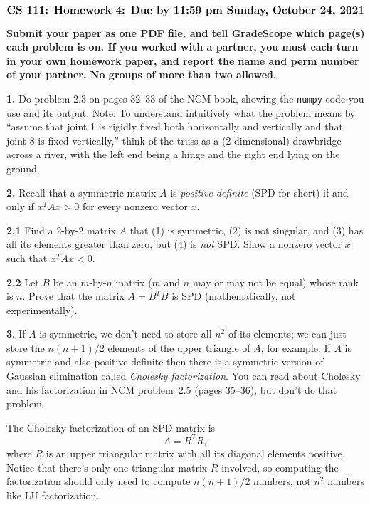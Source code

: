 \documentclass[11pt]{article}
\begin{document}
$$\mbox{\Large \bf CS 111: Homework 4: Due by 11:59 pm Sunday, October 24, 2021}$$
\par\smallskip\noindent
{\bf Submit your paper as one PDF file,
and tell GradeScope which page(s) each problem is on.
If you worked with a partner, you must each turn in your own 
homework paper, and report the name and perm number of your partner.
No groups of more than two allowed.
}

\par\bigskip
{\bf 1.}
Do problem 2.3 on pages 32--33 of the NCM book, 
showing the {\tt numpy} code you use and its output. 
Note: To understand intuitively what the problem means by 
``assume that joint 1 is rigidly fixed both horizontally and vertically 
and that joint 8 is fixed vertically,'' 
think of the truss as a (2-dimensional) drawbridge across a river, 
with the left end being a hinge and the right end lying on the ground.


\par\bigskip
{\bf 2.} Recall that a symmetric matrix $A$ is {\em positive definite}
(SPD for short) if and only if $x^TAx>0$ for every nonzero vector $x$.

\par\medskip
{\bf 2.1} Find a 2-by-2 matrix $A$ that (1) is symmetric, (2) is not singular,
and (3) has all its elements greater than zero, but (4) is {\em not} SPD.
Show a nonzero vector $x$ such that $x^TAx<0$.

\par\medskip
{\bf 2.2} Let $B$ be an $m$-by-$n$ matrix ($m$ and $n$ may or may not be equal) 
whose rank is $n$.
Prove that the matrix $A=B^TB$ is SPD (mathematically, not experimentally).

\par\bigskip
{\bf 3.} 
If $A$ is symmetric, we don't need to store all $n^2$ of its elements; 
we can just store the $n(n+1)/2$ elements of the upper triangle of $A$, for example.
If $A$ is symmetric and also positive definite then there is a symmetric
version of Gaussian elimination called {\em Cholesky factorization}.
You can read about Cholesky and his factorization in NCM problem~2.5 (pages 35--36),
but don't do that problem. 

The Cholesky factorization of an SPD matrix is
$$A = R^TR,$$
where $R$ is an upper triangular matrix with all its diagonal elements positive.
Notice that there's only one triangular matrix $R$ involved, so computing
the factorization should only need to compute $n(n+1)/2$ numbers, 
not $n^2$ numbers like LU factorization.
\end{document}
